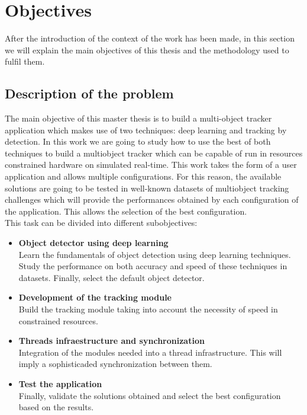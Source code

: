 \section{Objectives}
After the introduction of the context of the work has been made, in this section we will explain the main objectives of this thesis and the methodology used to fulfil them.

\subsection{Description of the problem}
The main objective of this master thesis is to build a multi-object tracker application which makes use of two techniques: deep learning and tracking by detection. In this work we are going to study how to use the best of both techniques to build a multiobject tracker which can be capable of run in resources constrained hardware on simulated real-time. This work takes the form of a user application and allows multiple configurations. For this reason, the available solutions are going to be tested in well-known datasets of multiobject tracking challenges which will provide the performances obtained by each configuration of the application. This allows the selection of the best configuration.\\
This task can be divided into different subobjectives:
\begin{itemize}
\item \textbf{Object detector using deep learning}\\
Learn the fundamentals of object detection using deep learning techniques. Study the performance on both accuracy and speed of these techniques in datasets. Finally, select the default object detector.
\item \textbf{Development of the tracking module}\\
Build the tracking module taking into account the necessity of speed in constrained resources.
\item \textbf{Threads infraestructure and synchronization}\\
Integration of the modules needed into a thread infrastructure. This will imply a sophisticaded synchronization between them.
\item \textbf{Test the application}\\
Finally, validate the solutions obtained and select the best configuration based on the results.
\end{itemize}

